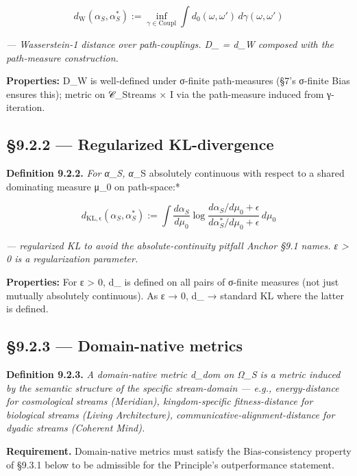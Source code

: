 \documentclass[11pt, openany]{book}
\newcommand{\sectionbreak}{\clearpage}
\begin{document}
\[
d_\mathrm{W}(\alpha_S, \alpha^*_S) := \inf_{\gamma \in \mathrm{Coupl}} \int d_0(\omega, \omega') \, d\gamma(\omega, \omega')
\]

\textit{--- Wasserstein-1 distance over path-couplings. D\_ = d\_\allowbreak{}W composed with the path-measure construction.}

\textbf{Properties:} D\_\allowbreak{}W is well-defined under σ-finite path-measures (§7's σ-finite Bias ensures this); metric on 𝒞\_\allowbreak{}Streams × I via the path-measure induced from γ-iteration.

\subsection{§9.2.2 --- Regularized KL-divergence}

\textbf{Definition 9.2.2.} \textit{For α\_\allowbreak{}S, α}\_\allowbreak{}S absolutely continuous with respect to a shared dominating measure μ\_\allowbreak{}0 on path-space:*

\[
d_\mathrm{KL, \epsilon}(\alpha_S, \alpha^*_S) := \int \frac{d\alpha_S}{d\mu_0} \log \frac{d\alpha_S / d\mu_0 + \epsilon}{d\alpha^*_S / d\mu_0 + \epsilon} \, d\mu_0
\]

\textit{--- regularized KL to avoid the absolute-continuity pitfall Anchor §9.1 names. ε > 0 is a regularization parameter.}

\textbf{Properties:} For ε > 0, d\_ is defined on all pairs of σ-finite measures (not just mutually absolutely continuous). As ε → 0, d\_ → standard KL where the latter is defined.

\subsection{§9.2.3 --- Domain-native metrics}

\textbf{Definition 9.2.3.} \textit{A domain-native metric d\_\allowbreak{}dom on Ω\_\allowbreak{}S is a metric induced by the semantic structure of the specific stream-domain --- e.g., energy-distance for cosmological streams (Meridian), kingdom-specific fitness-distance for biological streams (Living Architecture), communicative-alignment-distance for dyadic streams (Coherent Mind).}

\textbf{Requirement.} Domain-native metrics must satisfy the Bias-consistency property of §9.3.1 below to be admissible for the Principle's outperformance statement.

\sectionbreak
\end{document}

